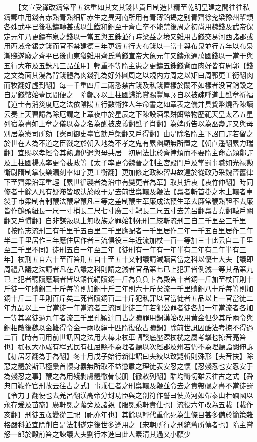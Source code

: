 　　【文宣受禪改鑄常平五銖重如其文其錢甚貴且制造甚精至乾明皇建之間往往私鑄鄴中用錢有赤熟青熟細眉赤生之異河南所用有青薄鉛錫之别青齊徐兖梁豫州輩類各殊武平已後私鑄轉甚或以生鐵和銅至于齊亡卒不能禁後周之初尚用魏錢及武帝保定元年乃更鑄布泉之錢以一當五與五銖並行時梁益之境又雜用古錢交易河西諸郡或用西域金銀之錢而官不禁建德三年更鑄五行大布錢以一當十與布泉並行五年以布泉漸賤遂廢之齊平已後山東猶雜用齊氏舊錢宣帝大象元年又鑄永通萬國錢以一當干與五行大布及五銖凡三品並用】輕重不等隋主患之更鑄五銖錢背面肉好皆有周郭【錢之文為面其漫為背錢體為肉錢孔為好外圓周之以規内方周之以矩曰周郭更工衡翻肉而牧翻好虛到翻】每一千重四斤二兩悉禁古錢及私錢置樣於關不如樣者没官銷毁之自是錢幣始壹民間便之　隋鄭譯以上柱國歸第賞賜豐厚譯自以被疎呼道士醮章祈福【道士有消災度厄之法依隂陽五行數術推人年命書之如章表之儀并具贄幣燒香陳讀云奏上天曹請為除厄謂之上章夜中於星辰之下陳設酒果䴵餌幣物歷祀天皇太乙五星列宿為書如上章之儀以奏之名為醮被皮義翻醮子肖翻】為婢所告以為巫蠱譯又與母别居為憲司所劾【憲司御史臺官劾戶槩翻又戶得翻】由是除名隋主下詔曰譯若留之於世在人為不道之臣戮之於朝入地為不孝之鬼有累幽顯無所置之【朝直遥翻累力瑞翻】宜賜以孝經令其熟讀仍遣與母共居　初周法比於齊律煩而不要隋主命高熲鄭譯及上柱國楊素率更令裴政等【太子率更令魏晉之制主宮殿門戶及掌罰事職如光禄勲衛尉隋制掌伎樂漏刻率如字更工衡翻】更加修定政練習典故達於從政乃采魏晉舊律下至齊梁沿革重輕【累世循襲者為沿中有變更者為革】取其折衷【衷竹仲翻】時同修者十餘人凡有疑滯皆取決於政于是去前世梟轘及鞭法【梟者斬首掛之木上轘者車裂于市梁制有制鞭法鞭常鞭凡三等之差制鞭生革廉成法鞭生革去廉常鞭熟靼不去廉皆作鶴頭紐長一尺一寸梢長二尺七寸廣三寸靶長二尺五寸去羌呂翻梟古堯翻轅戶關翻又戶慣翻】自非謀叛以上無收族之罪始制死刑二絞斬流刑三自二千里至三千里【按隋志流刑三有千里千五百里二千里應配者一千里居作二年一千五百里居作二年半二千里居作三年應住居作者三流俱役三年近流加杖一百一等加三十此云自二千里至三千里不同】徒刑五自一年至三年【徒刑有一年有一年半有二年有二年半有三年】杖刑五自六十至百笞刑五自十至五十又制議請減贖官當之科以優士大夫【議即周禮八議之法請者凡在八議之科則請之減者官品第七已上犯罪皆例減一等其品第九已上犯者聽贖應贖者皆以銅代絹贖銅一斤為負負卜為殿笞十者銅一斤加至杖百則十斤徒一年贖銅二十斤每等則加銅十斤三年則六十斤矣流一千里贖銅八十斤每等則加銅十斤二千里則百斤矣二死皆贖銅百二十斤犯私罪以官當徒者五品以上一官當徒二年九品以上一官當徒一年當流者三流同比徒三年若犯公罪者徒各加一年當流者各加一等其累徒過九年者流三千里孔穎達曰古之贖罪用銅漢始改用黄金但少其斤兩令與銅相敵後魏以金難得令金一兩收絹十匹隋復依古贖銅】除前世訊囚酷法考掠不得過二百【時有司用前世訊囚之法用大棒束杖車輻鞵底壓踝杖桄之屬考擊也掠音亮笞也】枷杖大小咸有程式民有枉屈縣不為理者聽以次經郡及州若仍不為理聽詣闕伸訴【枷居牙翻為于為翻】冬十月戊子始行新律詔曰夫絞以致斃斬則殊形【夫音扶】除惡之體於斯已極梟首轘身義無所取不益懲肅之理徒表安忍之懷【忍殘忍也安忍安于為殘忍之事】鞭之為用殘剥膚體徹骨侵肌【徹敕列翻】酷均臠切雖云往古之式【舜典曰鞭作官刑故云往古之式】事乖仁者之刑梟轘及鞭並令去之貴帶礪之書不當徒罸【令力丁翻使也去羌呂翻漢高帝分封功臣與之剖符作誓曰使黄河如帶泰山若礪國以永存爰及苗裔】廣軒冕之䕃旁及諸親【服冕乘軒貴仕也】流役六年改為五載【載作亥翻】刑徒五歲變從三祀【祀亦年也】其餘以輕代重化死為生條目甚多備於簡策雜格嚴科並宜除削自是法制遂定後世多遵用之【宋朝所行之刑統舊所傳者也】隋主嘗怒一郎於殿前笞之諫議大夫劉行本進曰此人素清其過又小願少